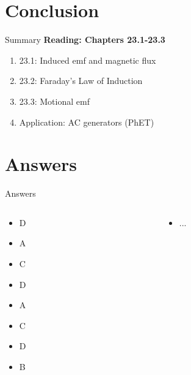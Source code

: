 \documentclass{beamer}
\begin{document}
\section{Conclusion}

\begin{frame}{Summary}
\textbf{Reading: Chapters 23.1-23.3} \\ \vspace{0.5cm}
\begin{enumerate}
\item 23.1: Induced emf and magnetic flux
\item 23.2: Faraday's Law of Induction
\item 23.3: Motional emf
\item Application: AC generators (PhET)
\end{enumerate}
\end{frame}

\section{Answers}

\begin{frame}{Answers}
\small
\begin{columns}[T]
\begin{column}{0.5\textwidth}
\begin{itemize}
\item D
\item A
\item C
\item D
\item A
\item C
\item D
\item B
\end{itemize}
\end{column}
\begin{column}{0.5\textwidth}
\begin{itemize}
\item ...
\end{itemize}
\end{column}
\end{columns}
\end{frame}
\end{document}
